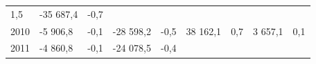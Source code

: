 \begin{longtable}[]{@{}lllllllll@{}}
\begin{minipage}[t]{0.06\columnwidth}
1,5\strut
\end{minipage} & \begin{minipage}[t]{0.08\columnwidth}\raggedright
-35 687,4\strut
\end{minipage} & \begin{minipage}[t]{0.06\columnwidth}\raggedright
-0,7\strut
\end{minipage}\tabularnewline
\begin{minipage}[t]{0.05\columnwidth}\raggedright
2010\strut
\end{minipage} & \begin{minipage}[t]{0.10\columnwidth}\raggedright
-5 906,8\strut
\end{minipage} & \begin{minipage}[t]{0.06\columnwidth}\raggedright
-0,1\strut
\end{minipage} & \begin{minipage}[t]{0.17\columnwidth}\raggedright
-28 598,2\strut
\end{minipage} & \begin{minipage}[t]{0.06\columnwidth}\raggedright
-0,5\strut
\end{minipage} & \begin{minipage}[t]{0.12\columnwidth}\raggedright
38 162,1\strut
\end{minipage} & \begin{minipage}[t]{0.06\columnwidth}\raggedright
0,7\strut
\end{minipage} & \begin{minipage}[t]{0.08\columnwidth}\raggedright
3 657,1\strut
\end{minipage} & \begin{minipage}[t]{0.06\columnwidth}\raggedright
0,1\strut
\end{minipage}\tabularnewline
\begin{minipage}[t]{0.05\columnwidth}\raggedright
2011\strut
\end{minipage} & \begin{minipage}[t]{0.10\columnwidth}\raggedright
-4 860,8\strut
\end{minipage} & \begin{minipage}[t]{0.06\columnwidth}\raggedright
-0,1\strut
\end{minipage} & \begin{minipage}[t]{0.17\columnwidth}\raggedright
-24 078,5\strut
\end{minipage} & \begin{minipage}[t]{0.06\columnwidth}\raggedright
-0,4\strut
\end{minipage} & \begin{minipage}[t]{0.12\columnwidth}\raggedright

\end{minipage}
\end{longtable}
